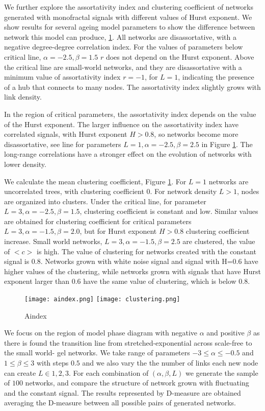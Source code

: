 We further explore the assortativity index and clustering coefficient of networks generated with monofractal signals with different values of Hurst exponent. We show results for several ageing model parameters to show the difference between network this model can produce, \ref{fig:aindex}. All networks are disassortative, with a negative degree-degree correlation index. For the values of parameters below critical line, $\alpha=-2.5, \beta=1.5$ $r$ does not depend on the Hurst exponent. Above the critical line are small-world networks, and they are disassortative with a minimum value of assortativity index $r =-1$, for $L=1$, indicating the presence of a hub that connects to many nodes. The assortativity index slightly grows with link density. 

In the region of critical parameters, the assortativity index depends on the value of the Hurst exponent. The larger influence on the assortativity index have correlated signals, with Hurst exponent $H>0.8$, so networks become more disassortative, see line for parameters $L=1, \alpha=-2.5, \beta=2.5$ in Figure \ref{fig:aindex}. The long-range correlations have a stronger effect on the evolution of networks with lower density. 

We calculate the mean clustering coefficient, Figure \ref{fig:aindex}. For $L=1$ networks are uncorrelated trees, with clustering coefficient $0$. For network density $L>1$, nodes are organized into clusters. Under the critical line, for parameter  $L=3, \alpha=-2.5, \beta=1.5 $, clustering coefficient is constant and low. Similar values are obtained for clustering coefficient for critical parameters $L=3, \alpha=-1.5, \beta=2.0$, but for Hurst exponent $H>0.8$ clustering coefficient increase. Small world networks,  $L=3, \alpha=-1.5, \beta=2.5$ are clustered, the value of $<c>$ is high.  The value of clustering for networks created with the constant signal is 0.8. Networks grown with white noise signal and signal with H=0.6 have higher values of the clustering, while networks grown with signals that have Hurst exponent larger than 0.6 have the same value of clustering, which is below 0.8. 

\begin{figure}[h!]
	\centering
	\texttt{[image: aindex.png]}
	\texttt{[image: clustering.png]}
	\caption{Aindex}
	\label{fig:aindex}
\end{figure} 

We focus on the region of model phase diagram with negative $\alpha$ and positive $\beta$ as there is found the transition line from stretched-exponential across scale-free to the small world- gel networks. We take range of parameters  $-3\leq\alpha\leq-0.5$ and $1\leq\beta\leq3$ with steps $0.5$ and we also vary the the number of links each new node can create $L\in{1, 2, 3}$. For each combination of $(\alpha, \beta, L)$ we generate the sample of $100$ networks, and compare the structure of network grown with fluctuating and the constant signal. The results represented by D-measure are obtained averaging the D-measure between all possible pairs of generated networks.     

